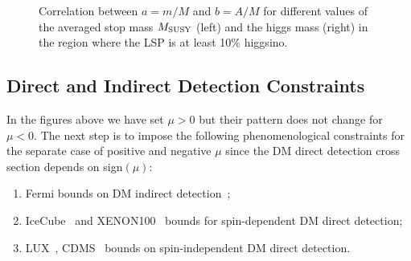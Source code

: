 \documentclass[12pt,a4paper]{book}
\newcommand{\ben}{\begin{enumerate}}
\newcommand{\een}{\end{enumerate}}
\begin{document}
\begin{figure}
\centering
{} \quad
{} 
\caption{Correlation between $a=m/M$ and $b=A/M$ for different values of the averaged stop mass $M_{\rm SUSY}$ (left) and the higgs mass (right) in the region where the LSP is at least 10\% higgsino.}
\label{Fig5}
\end{figure}

\subsection{Direct and Indirect Detection Constraints}

In the figures above we have set $\mu>0$ but their pattern does not change for $\mu<0$. The next step is to impose the following phenomenological constraints for the separate case of positive and negative $\mu$ since the DM direct detection cross section depends on sign$(\mu)$:
\ben
\item Fermi bounds on DM indirect detection~\cite{Ackermann:2015tah};
\item IceCube~\cite{Aartsen:2012kia} and XENON100~\cite{Orrigo:2015cha} bounds for spin-dependent DM direct detection;
\item LUX~\cite{Akerib:2013tjd}, CDMS~\cite{Agnese:2013rvf} bounds on spin-independent DM direct detection.
\een
\end{document}
